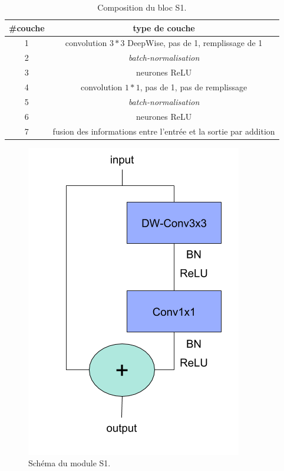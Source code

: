 \begin{table}[!htb]
\centering
\begin{tabular}{|c|c|}
\hline
\#couche & type de couche \\
\hline
\hline
1 & convolution $3*3$ DeepWise, pas de 1, remplissage de 1 \\
\hline
2 & \textit{batch-normalisation}\\
\hline
3 & neurones ReLU\\
\hline
4 & convolution $1*1$, pas de 1, pas de remplissage\\
\hline
5 & \textit{batch-normalisation}\\
\hline
6 & neurones ReLU \\
\hline
7 & fusion des informations entre l'entrée et la sortie par addition\\
\hline

\end{tabular}
\caption{Composition du bloc S1.}
\label{tab:S1}
\end{table}



\begin{figure}%
\centering
\includegraphics[width=.45\columnwidth]{figures/stride1.png}%
\caption{Schéma du module S1.}%
\label{fig:S1}%
\end{figure}

